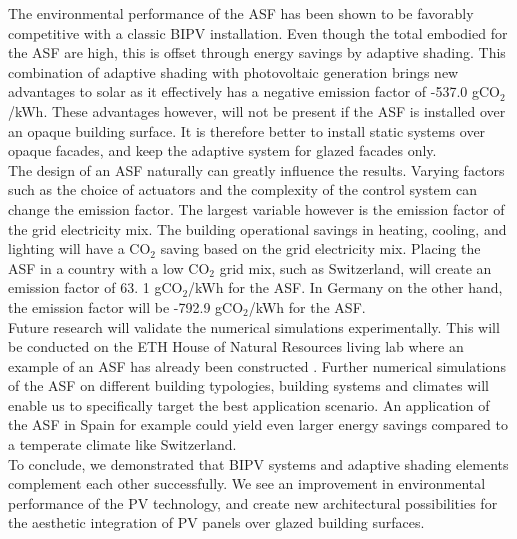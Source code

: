 
The environmental performance of the ASF has been shown to be favorably competitive with a classic BIPV installation. Even though the total embodied for the ASF are high, this is offset through energy savings by adaptive shading. This combination of adaptive shading with photovoltaic generation brings new advantages to solar as it effectively has a negative emission factor of -537.0 gCO${_2}$/kWh. These advantages however, will not be present if the ASF is installed over an opaque building surface. It is therefore better to install static systems over opaque facades, and keep the adaptive system for glazed facades only.\\

The design of an ASF naturally can greatly influence the results. Varying factors such as the choice of actuators and the complexity of the control system can change the emission factor. The largest variable however is the emission factor of the grid electricity mix. The building operational savings in heating, cooling, and lighting will have a CO${_2}$ saving based on the grid electricity mix. Placing the ASF in a country with a low CO${_2}$ grid mix, such as Switzerland, will create an emission factor of 63. 1 gCO${_2}$/kWh for the ASF. In Germany on the other hand, the emission factor will be -792.9 gCO${_2}$/kWh for the ASF.\\

Future research will validate the numerical simulations experimentally. This will be conducted on the ETH House of Natural Resources living lab where an example of an ASF has already been constructed \cite{nagy2015frontiers}. Further numerical simulations of the ASF on different building typologies, building systems and climates will enable us to specifically target the best application scenario. An application of the ASF in Spain for example could yield even larger energy savings compared to a temperate climate like Switzerland.\\

To conclude, we demonstrated that BIPV systems and adaptive shading elements complement each other successfully. We see an improvement in environmental performance of the PV technology, and create new architectural possibilities for the aesthetic integration of PV panels over glazed building surfaces. 



